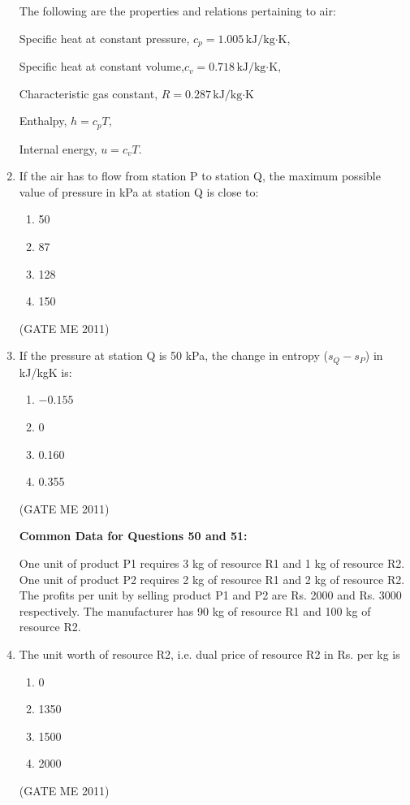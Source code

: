 \documentclass[journal]{IEEEtran}
\begin{document}
\begin{enumerate}
The following are the properties and relations pertaining to air:

Specific heat at constant pressure, $c_p = 1.005\,\text{kJ/kg·K},$

Specific heat at constant volume,$ c_v = 0.718\,\text{kJ/kg·K},$ 

Characteristic gas constant, $R = 0.287\,\text{kJ/kg·K}$

Enthalpy, $h = c_p T, $

Internal energy, $u = c_v T$.


\item If the air has to flow from station P to station Q, the maximum possible value of pressure in kPa at station Q is close to:

\begin{multicols}{2}
\begin{enumerate}
\item 50  
\item 87  
\item 128  
\item 150  
\end{enumerate}
\end{multicols}    
\hfill (GATE ME 2011)

\item If the pressure at station Q is 50 kPa, the change in entropy  ($ s_Q - s_P $) in kJ/kgK is:

\begin{multicols}{4}
\begin{enumerate}
\item $-0.155$  
\item 0  
\item 0.160  
\item 0.355  
\end{enumerate}
\end{multicols}    
\hfill (GATE ME 2011)

\textbf{Common Data for Questions 50 and 51:} 

 One unit of product P1 requires 3 kg of resource R1 and 1 kg of resource R2. One unit of product P2 requires 2 kg of resource R1 and 2 kg of resource R2. The profits per unit by selling product P1 and P2 are Rs. 2000 and Rs. 3000 respectively. The manufacturer has 90 kg of resource R1 and 100 kg of resource R2.
\item The unit worth of resource R2, i.e. dual price of resource R2 in Rs. per kg is
\begin{multicols}{4}
\begin{enumerate}
\item 0
\item 1350
\item 1500
\item 2000
\end{enumerate}
\end{multicols}    
\hfill (GATE ME 2011)


\end{enumerate}
\end{document}
